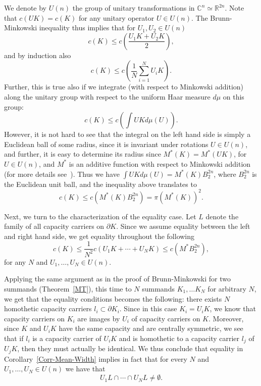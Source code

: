 \documentclass[12pt]{article}
\begin{document}
 We denote
by $U(n)$ the group of unitary transformations in ${\mathbb C}^n
\simeq {\mathbb R}^{2n}$. Note that $c(UK) = c(K)$ for any unitary
operator $U \in U(n)$. The Brunn-Minkowski inequality thus implies
that for $U_1, U_2 \in U(n)$
\[ c(K) \leq c \left (\frac{U_1K + U_2K}{2} \right ) ,\]
and by induction also
\[  c(K) \leq c \left ( \frac{1}{N} \sum_{i=1}^N U_iK \right ) .\]
Further, this is true also if we integrate (with respect to
Minkowski addition) along the unitary group with respect to the
uniform Haar measure $d \mu$ on this group:
\[ c(K) \leq c \left ( \int UK d \mu (U) \right ).\]
However, it is not hard to see that the integral on the left hand
side is simply a Euclidean ball of some radius, since it is
invariant under rotations $U \in U(n)$, and further, it is easy to
determine its radius since $M^*(K) = M^*(UK)$, for $U \in U(n)$, and
$M^*$ is an additive function with respect to Minkowski addition
(for more details see~\cite{Pisbook}). Thus we have $\int UK d \mu
(U) = M^*(K) B_2^{2n}$, where $B_2^{2n}$ is the Euclidean unit ball,
and the inequality above translates to
\begin{equation}  \label{eq_m_star} c(K) \leq c( M^*(K)B_2^{2n})={\pi}(M^*(K))^2. \end{equation}



Next, we turn to the characterization of the equality case. Let $L$
denote the family of all capacity carriers on $\partial K$. Since we
assume equality between the left and right hand side, we get
equality throughout the following
%
\[ c(K) \le \frac{1}{{N^2}}c(U_1K + \cdots + U_NK) \le
c(M^*B_2^{2n}),\] for any $N$ and $U_1, \ldots, U_N \in U(n)$.

Applying the same argument as in the proof of Brunn-Minkowski for
two summands (Theorem~\ref{MT}), this time to $N$ summands $K_1,
\ldots K_N$ for arbitrary $N$, we get that the equality conditions
becomes the following: there exists $N$ homothetic capacity carriers
$l_i \subset \partial K_i$. Since in this case $K_i = U_iK$, we know
that capacity carriers on $K_i$ are images by $U_i$ of capacity
carriers on $K$. Moreover, since $K$ and $U_iK$ have the same
capacity and are centrally symmetric, we see that if $l_i$ is a
capacity carrier of $U_iK$ and is homothetic to a capacity carrier
$l_j$ of $U_jK$, then they must actually be identical. We thus
conclude that equality in Corollary~\ref{Corr-Mean-Width} implies in
fact that for every $N$ and $U_1, \ldots, U_N \in U(n)$ we have that
\begin{equation} \label{eq1-eq-in-Mstar} U_1 L \cap \cdots \cap U_NL \neq \emptyset.
\end{equation}
\end{document}
